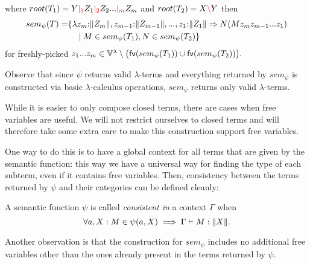 \documentclass[main.tex]{subfiles}
\begin{document}
\begin{defn}
\begin{enumerate}
\begin{center}
            \end{center}
            where $root(T_1) = Y \textcolor{red}{|_{1}} Z_1 \textcolor{red}{|_{2}} Z_2 ... \textcolor{red}{|_{m}} Z_m$ and $root(T_2) = X \textcolor{red}{\backslash} Y$ then
            \[
                \begin{split}
                    sem_{\psi}(T) =& \{
                        \lambda z_m {:} \|Z_m\|, z_{m - 1} {:} \|Z_{m - 1}\|, ..., z_1 {:} \|Z_1\| \Rightarrow
                        N ( M z_m z_{m - 1} ... z_1 ) \\
                        & \quad \mid M \in sem_{\psi}(T_1), N \in sem_{\psi}(T_2) \} \\
                \end{split}
            \]
            for freshly-picked
            $z_1 ... z_m \in \mathbb{V}^{\lambda} \setminus \big(\mathsf{fv}(sem_{\psi}(T_1)) \cup \mathsf{fv}(sem_{\psi}(T_2))\big).$
    \end{enumerate}
\end{defn}

Observe that since $\psi$ returns valid $\lambda$-terms and everything
returned by $sem_{\psi}$ is constructed via basic $\lambda$-calculus operations,
$sem_{\psi}$ returns only valid $\lambda$-terms.

While it is easier to only compose closed terms, there are cases when free
variables are useful. We will not restrict ourselves to closed terms and will
therefore take some extra care to make this construction support free variables.

One way to do this is to have a global context for all terms that are given
by the semantic function: this way we have a universal way for finding the
type of each subterm, even if it contains free variables. Then, consistency
between the terms returned by $\psi$ and their categories can be defined
cleanly:

\begin{defn}
    A semantic function $\psi$ is called \emph{consistent in} a context
    $\Gamma$ when
    \[
        \forall a, X: M \in \psi(a, X) \implies \Gamma \vdash M : \|X\|.
    \]
\end{defn}

Another observation is that the construction for $sem_{\psi}$ includes no
additional free variables other than the ones already present in the terms
returned by $\psi$.
\end{document}
